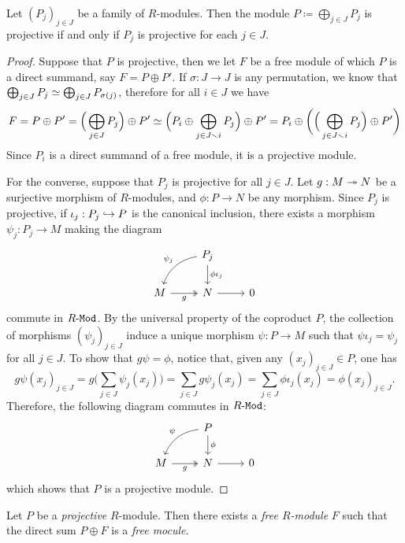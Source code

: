 \begin{proposition}
\label{prop:direct-sum-projective}
Let \((P_j)_{j \in J}\) be a family of \(R\)-modules. Then the module
\(P \coloneq \bigoplus_{j \in J} P_j\) is projective if and only if \(P_j\) is
projective for each \(j \in J\).
\end{proposition}

\begin{proof}
Suppose that \(P\) is projective, then we let \(F\) be a free module of which
\(P\) is a direct summand, say \(F = P \oplus P'\). If \(\sigma: J \to J\) is
any permutation, we know that \(\bigoplus_{j \in J} P_j \simeq
\bigoplus_{j \in J} P_{\sigma(j)}\), therefore for all \(i \in J\) we have
\[
F = P \oplus P' = \Big( \bigoplus_{j \in J} P_j \Big) \oplus P'
\simeq \Big( P_i \oplus \bigoplus_{j \in J \smallsetminus i} P_j \Big) \oplus P'
= P_i \oplus \bigg(\Big(\bigoplus_{j \in J \smallsetminus i} P_j \Big) \oplus P'\bigg)
\]
Since \(P_i\) is a direct summand of a free module, it is a projective module.

For the converse, suppose that \(P_j\) is projective for all \(j \in J\). Let
\(g: M \twoheadrightarrow N\) be a surjective morphism of \(R\)-modules, and \(\phi: P \to N\)
be any morphism. Since \(P_j\) is projective, if \(\iota_j: P_j \hookrightarrow P\) is the
canonical inclusion, there exists a morphism \(\psi_j: P_j \to M\) making the
diagram
\[
\begin{tikzcd}
&P_j \ar[d, "\phi \iota_j"] \ar[dl, bend right, "\psi_j"'] &\\
M \ar[r, two heads, "g"'] &N \ar[r] &0
\end{tikzcd}
\]
commute in \({R\text{-}\texttt{Mod}}\). By the universal property of the coproduct \(P\), the
collection of morphisms \((\psi_j)_{j \in J}\) induce a unique morphism \(\psi:
P \to M\) such that \(\psi \iota_j = \psi_j\) for all \(j \in J\). To show that
\(g \psi = \phi\), notice that, given any \((x_j)_{j \in J} \in P\), one has
\[
g \psi(x_j)_{j \in J} = g \Big(\sum_{j \in J} \psi_j(x_j)\Big)
= \sum_{j \in J} g \psi_j(x_j)
= \sum_{j \in J} \phi \iota_j(x_j)
= \phi(x_j)_{j \in J}.
\]
Therefore, the following diagram commutes in \({R\text{-}\texttt{Mod}}\):
\[
\begin{tikzcd}
&P \ar[d, "\phi"] \ar[dl, bend right, "\psi"'] &\\
M \ar[r, two heads, "g"'] &N \ar[r] &0
\end{tikzcd}
\]
which shows that \(P\) is a projective module.
\end{proof}

\begin{proposition}
\label{prop:eilenberg-trick}
Let \(P\) be a \emph{projective} \(R\)-module. Then there exists a \emph{free
  \(R\)-module} \(F\) such that the direct sum \(P \oplus F\) is a \emph{free
  mocule}.
\end{proposition}

